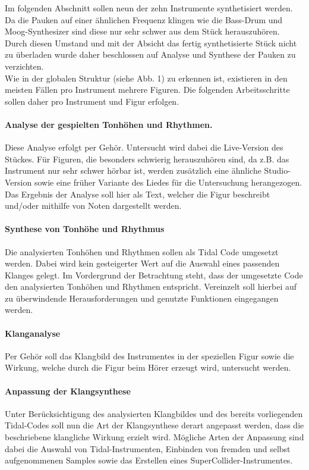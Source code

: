 \documentclass[
10pt, %
a4paper, %
oneside, %
headinclude,footinclude, %
BCOR5mm, %
]{scrartcl}
\begin{document}
\noindent Im folgenden Abschnitt sollen neun der zehn Instrumente synthetisiert werden. Da die Pauken auf einer ähnlichen Frequenz klingen wie die Bass-Drum und Moog-Synthesizer sind diese nur sehr schwer aus dem Stück herauszuhören. Durch diesen Umstand und mit der Absicht das fertig synthetisierte Stück nicht zu überladen wurde daher beschlossen auf Analyse und Synthese der Pauken zu verzichten.\\

\noindent Wie in der globalen Struktur (siehe Abb. 1) zu erkennen ist, existieren in den meisten Fällen pro Instrument mehrere Figuren. Die folgenden Arbeitsschritte sollen daher pro Instrument und Figur erfolgen.

\paragraph{Analyse der gespielten Tonhöhen und Rhythmen.}  Diese Analyse erfolgt per Gehör. Untersucht wird dabei die Live-Version\cite{YT1} des Stückes. Für Figuren, die besonders schwierig herauszuhören sind, da z.B. das Instrument nur sehr schwer hörbar ist, werden zusätzlich eine ähnliche Studio-Version\cite{YT2} sowie eine früher Variante\cite{YT3} des Liedes für die Untersuchung herangezogen.	Das Ergebnis der Analyse soll hier als Text, welcher die Figur beschreibt und/oder mithilfe von Noten dargestellt werden. 

\paragraph{Synthese von Tonhöhe und Rhythmus} Die analysierten Tonhöhen und Rhythmen sollen als Tidal Code umgesetzt werden. Dabei wird kein gesteigerter Wert auf die Auswahl eines passenden Klanges gelegt. Im Vordergrund der Betrachtung steht, dass der umgesetzte Code den analysierten Tonhöhen und Rhythmen entspricht. Vereinzelt soll hierbei auf zu überwindende Herausforderungen und genutzte Funktionen eingegangen werden.

\paragraph{Klanganalyse} Per Gehör soll das Klangbild des Instrumentes in der speziellen Figur sowie die Wirkung, welche durch die Figur beim Hörer erzeugt wird, untersucht werden. 

\paragraph{Anpassung der Klangsynthese} Unter Berücksichtigung des analysierten Klangbildes und des bereits vorliegenden Tidal-Codes soll nun die Art der Klangsynthese derart angepasst werden, dass die beschriebene klangliche Wirkung erzielt wird. Mögliche Arten der Anpassung sind dabei die Auswahl von Tidal-Instrumenten, Einbinden von fremden und selbst aufgenommenen Samples sowie das Erstellen eines SuperCollider-Instrumentes.\\
\end{document}
